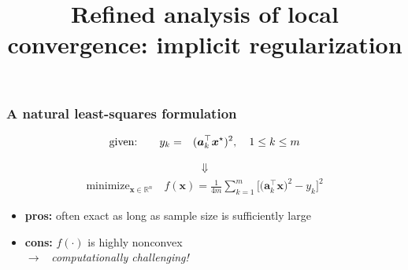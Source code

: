 \documentclass[compress,
mathserif,wide,%
]{beamer}
\title %
{Refined analysis of local convergence: implicit regularization}
\begin{document}
\begin{frame}[plain]
  \titlepage

\end{frame}








\begin{frame}
\frametitle{A natural least-squares formulation}

\begin{eqnarray*}
	\text{given:}\qquad y_k &= &(\bm{a}_k^\top\bm{x}^{\star})^2, \quad  1\leq k \leq m  
\end{eqnarray*}

\vspace{-2em}
\begin{align*}
	\Downarrow
\end{align*}
\vspace{-2em}
%
%
\begin{align*} 
	\text{minimize}_{\bm{x}\in \mathbb{R}^n}\quad f(\bm{x})=\frac{1}{4m}\sum_{k=1}^{m}\Big[ \big(\bm{a}_{k}^{\top}\bm{x}\big)^{2}-y_{k} \Big]^{2}
\end{align*}
%
\bigskip

\begin{itemize}
	\itemsep1em
	\pause
	\item {\bf pros:} often exact as long as sample size is sufficiently large
	\pause
	\item {\bf cons:} $f(\cdot)$ is highly nonconvex \\
		\hspace{6em} $\longrightarrow$~ {\em computationally challenging!} 
\end{itemize}

\end{frame}
\end{document}

